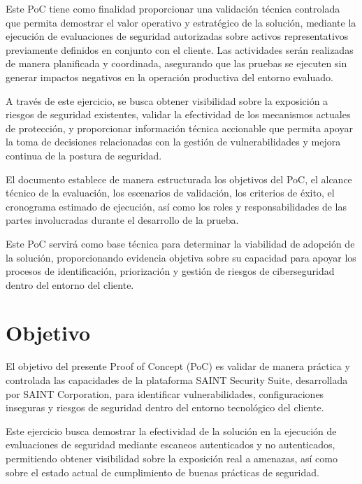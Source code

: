 \documentclass[a4paper]{article}
\begin{document}
    Este PoC tiene como finalidad proporcionar una validación técnica controlada que permita demostrar el valor operativo y estratégico de la solución, mediante la ejecución de evaluaciones de seguridad autorizadas sobre activos representativos previamente definidos en conjunto con el cliente. Las actividades serán realizadas de manera planificada y coordinada, asegurando que las pruebas se ejecuten sin generar impactos negativos en la operación productiva del entorno evaluado.

    A través de este ejercicio, se busca obtener visibilidad sobre la exposición a riesgos de seguridad existentes, validar la efectividad de los mecanismos actuales de protección, y proporcionar información técnica accionable que permita apoyar la toma de decisiones relacionadas con la gestión de vulnerabilidades y mejora continua de la postura de seguridad.

    El documento establece de manera estructurada los objetivos del PoC, el alcance técnico de la evaluación, los escenarios de validación, los criterios de éxito, el cronograma estimado de ejecución, así como los roles y responsabilidades de las partes involucradas durante el desarrollo de la prueba.

    Este PoC servirá como base técnica para determinar la viabilidad de adopción de la solución, proporcionando evidencia objetiva sobre su capacidad para apoyar los procesos de identificación, priorización y gestión de riesgos de ciberseguridad dentro del entorno del cliente.

    \section{Objetivo}
    El objetivo del presente Proof of Concept (PoC) es validar de manera práctica y controlada las capacidades de la plataforma SAINT Security Suite, desarrollada por SAINT Corporation, para identificar vulnerabilidades, configuraciones inseguras y riesgos de seguridad dentro del entorno tecnológico del cliente.

    Este ejercicio busca demostrar la efectividad de la solución en la ejecución de evaluaciones de seguridad mediante escaneos autenticados y no autenticados, permitiendo obtener visibilidad sobre la exposición real a amenazas, así como sobre el estado actual de cumplimiento de buenas prácticas de seguridad.
\end{document}
